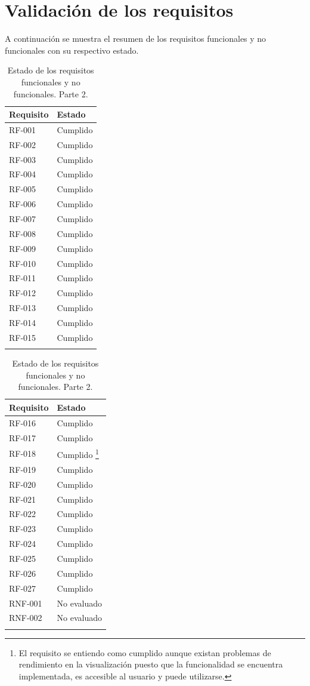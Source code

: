\section{Validación de los requisitos}
A continuación se muestra el resumen de los requisitos funcionales y no funcionales con su respectivo estado.
\begin{longtable}{|p{4cm}|p{4cm}|}
    \hline
    \textbf{Requisito} & \textbf{Estado} \\
\hline
RF-001 & Cumplido \\
\hline
RF-002 & Cumplido \\
\hline
RF-003 & Cumplido \\
\hline
RF-004 & Cumplido \\
\hline
RF-005 & Cumplido \\
\hline
RF-006 & Cumplido \\
\hline
RF-007 & Cumplido \\
\hline
RF-008 & Cumplido \\
\hline
RF-009 & Cumplido \\
\hline
RF-010 & Cumplido \\
\hline
RF-011 & Cumplido \\
\hline
RF-012 & Cumplido \\
\hline
RF-013 & Cumplido \\
\hline
RF-014 & Cumplido \\
\hline
RF-015 & Cumplido \\
\hline
\caption{Estado de los requisitos funcionales y no funcionales. Parte 2.}
\end{longtable}

\begin{longtable}{|p{4cm}|p{4cm}|}
    \hline
    \textbf{Requisito} & \textbf{Estado} \\
\hline
RF-016 & Cumplido \\
\hline
RF-017 & Cumplido \\
\hline
RF-018 & Cumplido \footnote{El requisito se entiendo como cumplido aunque existan problemas de rendimiento en la visualización puesto que la funcionalidad se encuentra implementada, es accesible al usuario y puede utilizarse.} \\
\hline
RF-019 & Cumplido \\
\hline
RF-020 & Cumplido \\
\hline
RF-021 & Cumplido \\
\hline
RF-022 & Cumplido \\
\hline
RF-023 & Cumplido \\
\hline
RF-024 & Cumplido \\
\hline
RF-025 & Cumplido \\
\hline
RF-026 & Cumplido \\
\hline
RF-027 & Cumplido \\
\hline
\hline
RNF-001 & No evaluado \\
\hline
RNF-002 & No evaluado \\
\hline
\caption{Estado de los requisitos funcionales y no funcionales. Parte 2.}
\end{longtable}

